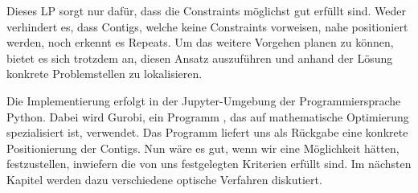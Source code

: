 Dieses LP sorgt nur dafür, dass die Constraints möglichst gut erfüllt sind. Weder verhindert es, dass Contigs, welche keine Constraints vorweisen, nahe positioniert werden, noch erkennt es Repeats. Um das weitere Vorgehen planen zu können, bietet es sich trotzdem an, diesen Ansatz auszuführen und anhand der Lösung konkrete Problemstellen zu lokalisieren. 


Die Implementierung erfolgt in der Jupyter-Umgebung der Programmiersprache Python. Dabei wird Gurobi, 
ein Programm
, das auf mathematische Optimierung spezialisiert ist, verwendet. Das Programm liefert uns als Rückgabe eine konkrete Positionierung der Contigs. Nun wäre es gut, wenn wir eine Möglichkeit hätten, festzustellen, inwiefern die von uns festgelegten Kriterien erfüllt sind. Im nächsten Kapitel werden dazu verschiedene optische Verfahren diskutiert.




